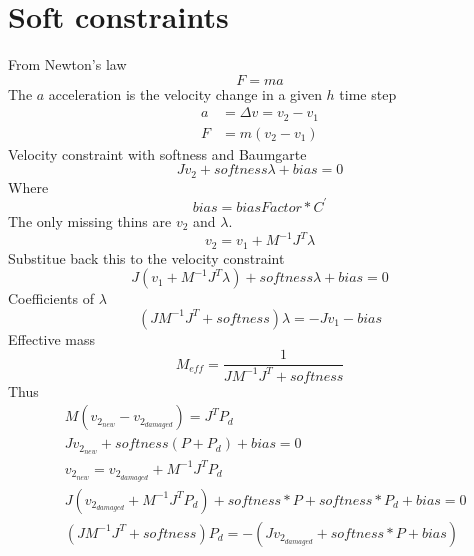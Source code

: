 \documentclass{article}
\begin{document}
	\section{Soft constraints}
	From Newton's law
	$$
		F = ma
	$$
	The $a$ acceleration is the velocity change in a given $h$ time step
	\begin{align}
		a &= \Delta v = v_2 - v_1\\
		F &= m(v_2 - v_1)
	\end{align}
	Velocity constraint with softness and Baumgarte
	$$
		Jv_2 + softness\lambda + bias = 0
	$$
	Where 
	$$
		bias = biasFactor * C^{'}	
	$$
	The only missing thins are $v_2$ and $\lambda$.
	$$
		v_2 = v_1 + M^{-1}J^T\lambda
	$$
	Substitue back this to the velocity constraint
	$$
		J(v_1 + M^{-1}J^T\lambda) + softness\lambda + bias = 0
	$$
	Coefficients of $\lambda$
	$$
		(JM^{-1}J^T + softness)\lambda = -Jv_1 - bias
	$$
	Effective mass
	$$
		M_{eff}	 = \frac{1}{JM^{-1}J^T + softness}
	$$
	Thus
	\begin{align*}
		&M(v_{2_{new}} - v_{2_{damaged}}) = J^TP_d\\
		&Jv_{2_{new}} + softness(P + P_d) + bias = 0\\
		&v_{2_{new}} = v_{2_{damaged}} + M^{-1}J^TP_d\\
		&J(v_{2_{damaged}} + M^{-1}J^TP_d) + softness * P + softness * P_d + bias = 0\\
		&(JM^{-1}J^T + softness)P_d = -(Jv_{2_{damaged}} + softness * P + bias)
	\end{align*}
	\newpage
\end{document}
